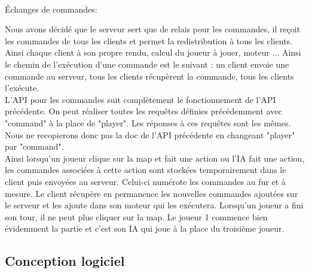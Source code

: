 \documentclass[12pt,a4paper]{article}
\begin{document}
\\Échanges de commandes:

Nous avons décidé que le serveur sert que de relais pour les commandes, il reçoit les commandes de tous les clients et permet la redistribution à tous les clients. Ainsi chaque client à son propre rendu, calcul du joueur à jouer, moteur ... Ainsi le chemin de l'exécution d'une commande est le suivant : un client envoie une commande au serveur, tous les clients récupèrent la commande, tous les clients l'exécute.\\
L'API pour les commandes suit complètement le fonctionnement de l'API précédente. On peut réaliser toutes les requêtes définies précédemment avec "command" à la place de "player". Les réponses à ces requêtes sont les mêmes. Nous ne recopierons donc pas la doc de l'API précédente en changeant "player" par "command".\\  
Ainsi lorsqu'un joueur clique sur la map et fait une action ou l'IA fait une action, les commandes associées à cette action sont stockées temporairement dans le client puis envoyées au serveur.  Celui-ci numérote les commandes au fur et à mesure. Le client récupère en permanence les nouvelles commandes ajoutées sur le serveur et les ajoute dans son moteur qui les exécutera. Lorsqu'un joueur a fini son tour, il ne peut plus cliquer sur la map. Le joueur 1 commence bien évidemment la partie et c'est son IA qui joue à la place du troisième joueur.

\subsection{Conception logiciel}
\end{document}
